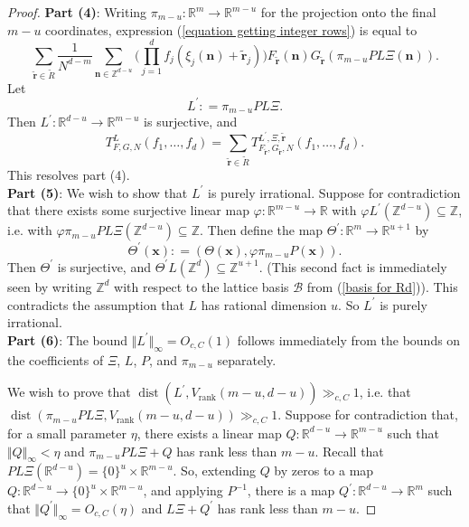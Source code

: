 \documentclass[12pt,a4paper,twoside,reqno]{amsart}
\newcommand{\rank}{\operatorname{rank}}
\newcommand{\dist}{\operatorname{dist}}
\numberwithin{equation}{section}
\begin{document}
\begin{proof}
\textbf{Part (4)}: Writing $\pi_{m-u}:\mathbb{R}^{m}\longrightarrow \mathbb{R}^{m-u}$ for the projection onto the final $m-u$ coordinates, expression (\ref{equation getting integer rows}) is equal to 
\begin{equation}
\label{equation end of second part}
\sum\limits_{\widetilde{\mathbf{r}} \in \widetilde{R}}\frac{1}{N^{d-m}} \sum\limits_{\mathbf{n} \in \mathbb{Z}^{d-u}} \Big(\prod\limits_{j=1}^d f_j(\xi_j(\mathbf{n}) + \widetilde{\mathbf{r}}_j) \Big)F_{\widetilde{\mathbf{r}}}(\mathbf{n})G_{\widetilde{\mathbf{r}}}( \pi_{m-u} PL\Xi(\mathbf{n})).
\end{equation} 
\noindent Let 
\begin{equation}
\label{equation definition of L prime}
L^\prime: = \pi_{m-u} PL\Xi.
\end{equation} Then $L^\prime:\mathbb{R}^{d-u} \longrightarrow \mathbb{R}^{m-u}$ is surjective, and \[T_{F,G,N}^L(f_1,\dots,f_d) = \sum\limits_{\widetilde{\mathbf{r}} \in \widetilde{R}}T_{F_{\widetilde{\mathbf{r}}},G_{\widetilde{\mathbf{r}}},N}^{L^\prime,\Xi,\widetilde{\mathbf{r}}}(f_1,\dots,f_d).\] This resolves part (4).\\

\textbf{Part (5)}:  We wish to show that $L^\prime$ is purely irrational. Suppose for contradiction that there exists some surjective linear map $\varphi:\mathbb{R}^{m-u} \longrightarrow \mathbb{R}$ with $\varphi L^\prime (\mathbb{Z}^{d-u}) \subseteq \mathbb{Z}$, i.e. with $\varphi \pi_{m-u} PL\Xi(\mathbb{Z}^{d-u}) \subseteq \mathbb{Z}$. Then define the map $\Theta^\prime:\mathbb{R}^m \longrightarrow \mathbb{R}^{u+1}$ by \[ \Theta^\prime(\mathbf{x}) : = (\Theta(\mathbf{x}),\varphi \pi_{m-u} P(\mathbf{x})).\] Then $\Theta^\prime$ is surjective, and $\Theta^\prime L(\mathbb{Z}^d)\subseteq \mathbb{Z}^{u+1}$. (This second fact is immediately seen by writing $\mathbb{Z}^d$ with respect to the lattice basis $\mathcal{B}$ from (\ref{basis for Rd})). This contradicts the assumption that $L$ has rational dimension $u$. So $L^\prime$ is purely irrational.  \\

\textbf{Part (6)}: The bound $\Vert L^\prime\Vert_\infty = O_{c,C}(1)$ follows immediately from the bounds on the coefficients of $\Xi$, $L$, $P$, and $\pi_{m-u}$ separately. 

We wish to prove that $\dist(L^\prime, V_{\rank}(m-u,d-u)) \gg_{c,C} 1$, i.e. that\\ $\dist(\pi_{m-u} PL\Xi, V_{\rank}(m-u,d-u)) \gg_{c,C} 1$. Suppose for contradiction that, for a small parameter $\eta$, there exists a linear map $Q: \mathbb{R}^{d-u} \longrightarrow \mathbb{R}^{m-u}$ such that $\Vert Q\Vert_{\infty}<\eta$ and $\pi_{m-u} PL\Xi + Q$ has rank less than $m-u$. 
Recall that $PL\Xi (\mathbb{R}^{d-u}) = \{0\}^u \times \mathbb{R}^{m-u}$. So, extending $Q$ by zeros to a map $Q:\mathbb{R}^{d-u} \longrightarrow \{0\}^u \times \mathbb{R}^{m-u}$, and applying $P^{-1}$, there is a map $Q^\prime:\mathbb{R}^{d-u} \longrightarrow \mathbb{R}^m$ such that $\Vert Q^\prime\Vert_{\infty}=O_{c,C}(\eta)$ and $L\Xi + Q^\prime$ has rank less than $m-u$. 


\end{proof}
\end{document}
